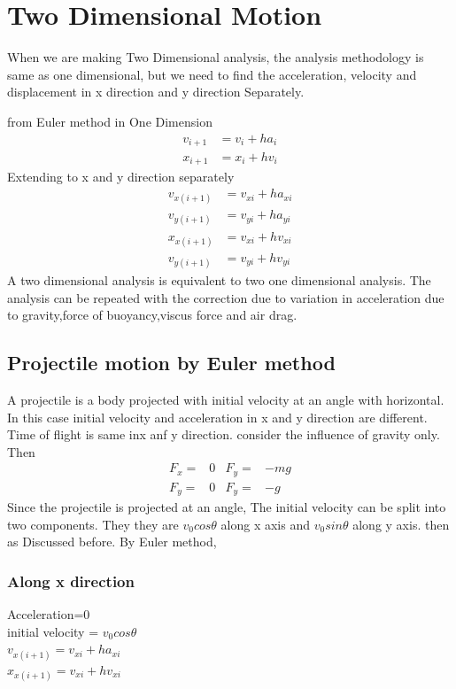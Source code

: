 \documentclass[12pt,a4paper]{article}
\begin{document}
	\section{Two Dimensional Motion }
	When we are making Two Dimensional analysis, the analysis methodology is same as one dimensional, but we need to find the acceleration, velocity and displacement in x direction and y direction Separately.

	from Euler method in One Dimension
	\begin{align}
		v_{i+1}&=v_i+ha_i\\
		x_{i+1}&=x_i+hv_i
	\end{align}
	Extending to x and y direction separately
	\begin{align}
		v_{x(i+1)}&=v_{xi}+ha_{xi}\\
		v_{y(i+1)}&=v_{yi}+ha_{yi}\\
		x_{x(i+1)}&=v_{xi}+hv_{xi}\\
		v_{y(i+1)}&=v_{yi}+hv_{yi}
	\end{align}
	A two dimensional analysis is equivalent to two one dimensional analysis. The analysis can be repeated with the correction due to variation in acceleration due to gravity,force of buoyancy,viscus force and air drag.

	\subsection{Projectile motion by Euler method }
	A projectile is a body projected with initial velocity at an angle with horizontal. In this case initial velocity and acceleration in x and y direction  are different. Time of flight is same inx anf y direction.
	consider the influence of gravity only. Then 
	\begin{align}
		F_x=&0		&F_y=&-mg\\
		F_y=&0		&F_y=&-g
	\end{align} 
	Since the projectile is projected at an angle, The initial velocity can be split into two components. They they are \(v_0 cos \theta \) along x axis and \(v_0 sin \theta \) along y axis. then as Discussed before. By Euler method,\\
	\subsubsection{Along x direction}
	Acceleration=0\\
	initial velocity = \(v_0 cos \theta\)\\
	\(v_{x(i+1)}=v_{xi}+ha_{xi}\)\\
	\(x_{x(i+1)}=v_{xi}+hv_{xi}\)\\
\end{document}
